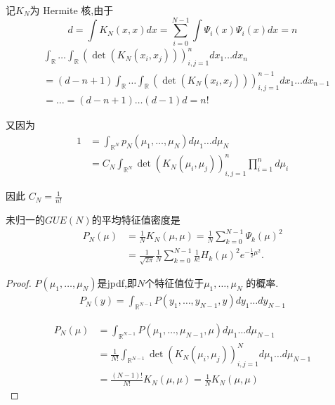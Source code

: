 \begin{corollary}
    记$K_N$为 Hermite 核,由于
    \[d = \int K_N(x,x)dx = \sum_{i=0}^{N-1} \int \Psi_i(x) \Psi_i(x)dx=n\]
    \begin{equation*}
        \begin{aligned}
            &\int_{\mathbb{R}} \ldots \int_{\mathbb{R}} (\det (K_N(x_i, x_j)))_{i,j=1}^n dx_1 \ldots dx_n\\
            &=(d-n+1) \int_{\mathbb{R}} \ldots \int_{\mathbb{R}} (\det (K_N(x_i, x_j)))_{i,j=1}^{n-1} dx_1 \ldots dx_{n-1}\\
            &= \ldots = (d-n+1) \ldots (d-1)d = n!
        \end{aligned}
    \end{equation*}
    
又因为
\begin{equation*}
    \begin{aligned}
        1 &= \int_{\mathbb{R}^N}p_N (\mu_1, \ldots, \mu_N) d\mu_1 \ldots d\mu_N\\
        &=C_N \int_{\mathbb{R}^N} \det(K_N (\mu_i, \mu_j))_{i,j=1}^n \prod_{i=1}^n d\mu_i
    \end{aligned}
\end{equation*}

因此 $C_N = \frac{1}{n!}$
\end{corollary}

\begin{theorem}
    未归一的$GUE(N)$的平均特征值密度是
    \begin{equation*}
        \begin{aligned}
            P_N(\mu) &= \frac{1}{N} K_N(\mu,\mu) = \frac{1}{N} \sum_{k=0}^{N-1} \Psi_k(\mu)^2\\
            &= \frac{1}{\sqrt{2\pi}} \frac{1}{N} \sum_{k=0}^{N-1} \frac{1}{k!} H_k(\mu)^2 e^{-\frac{1}{2}\mu^2}.
        \end{aligned}
    \end{equation*}
\end{theorem}

\begin{proof}
    $P(\mu_1, \ldots, \mu_N)$是jpdf,即$N$个特征值位于$\mu_1, \ldots, \mu_N$ 的概率.
\begin{equation*}
    \begin{aligned}
        P_N(y) = \int_{\mathbb{R}^{N-1}} P(y_1, \ldots, y_{N-1}, y) d y_1 \ldots d y_{N-1}
    \end{aligned}
\end{equation*}

\begin{equation*}
    \begin{aligned}
        P_N(\mu) &= \int_{\mathbb{R}^{N-1}} P(\mu_1, \ldots, \mu_{N-1}, \mu) d \mu_1 \ldots d \mu_{N-1}\\
        &= \frac{1}{N!} \int_{\mathbb{R}^{N-1}} \det (K_N(\mu_i, \mu_j))_{i,j=1}^N d\mu_1 \ldots d\mu_{N-1}\\
        &= \frac{(N-1)!}{N!} K_N(\mu,\mu) = \frac{1}{N} K_N(\mu,\mu)
    \end{aligned}
\end{equation*}

\end{proof}